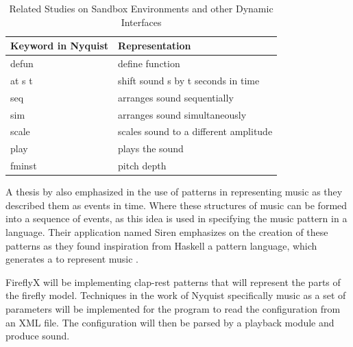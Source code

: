 \begin{table}[H]
\centering
\label{NyquistKeywords}
\caption{Related Studies on Sandbox Environments and other Dynamic Interfaces \cite{dannenberg1997machine}}
\begin{tabular}{|l|l|} 
\hline
\textbf{Keyword in Nyquist}  & \textbf{Representation}                \\ 
\hline
defun                        & define function                        \\ 
\hline
at s t                       & shift sound s by t seconds in time     \\ 
\hline
seq                          & arranges sound sequentially            \\ 
\hline
sim                          & arranges sound simultaneously          \\ 
\hline
scale                        & scales sound to a different amplitude  \\ 
\hline
play                         & plays the sound                        \\ 
\hline
fminst                       & pitch depth                            \\
\hline
\end{tabular}
\end{table}

A thesis by  also emphasized in the use of patterns in representing music as they described them as events in time. Where these structures of music can be formed into a sequence of events, as this idea is used in specifying the music pattern in a language. Their application named Siren emphasizes on the creation of these patterns as they found inspiration from Haskell a pattern language, which generates a  to represent music \cite{ince2019programming}.

FireflyX will be implementing clap-rest patterns that will represent the parts of the firefly model. Techniques in the work of Nyquist specifically music as a set of parameters will be implemented for the program to read the configuration from an XML file. The configuration will then be parsed by a playback module and produce sound.



